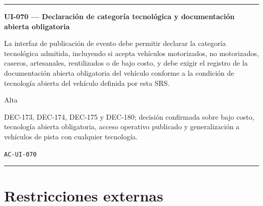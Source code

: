 \documentclass[10pt,letterpaper]{article}
\begin{document}
\vspace{0.25em}\hrule\vspace{0.65em}
\noindent\textbf{UI-070 --- Declaración de categoría tecnológica y documentación abierta obligatoria}\par
\begin{description}[style=nextline,leftmargin=3.15cm,labelwidth=2.8cm,font=\normalfont\bfseries]
\item[Obligación] La interfaz de publicación de evento debe permitir declarar la categoría tecnológica admitida, incluyendo si acepta vehículos motorizados, no motorizados, caseros, artesanales, reutilizados o de bajo costo, y debe exigir el registro de la documentación abierta obligatoria del vehículo conforme a la condición de tecnología abierta del vehículo definida por esta SRS.
\item[Prioridad] Alta
\item[Procedencia] DEC-173, DEC-174, DEC-175 y DEC-180; decisión confirmada sobre bajo costo, tecnología abierta obligatoria, acceso operativo publicado y generalización a vehículos de pista con cualquier tecnología.
\item[Verificación] \texttt{AC-UI-070}
\end{description}
\vspace{0.25em}\hrule\vspace{0.65em}
\section{Restricciones externas}
\end{document}
